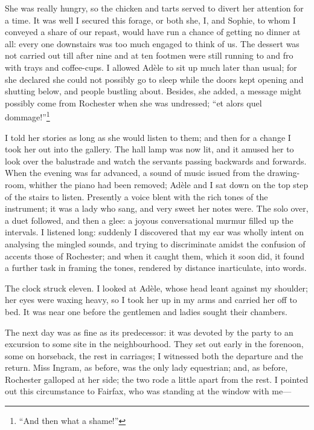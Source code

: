 She was really hungry, so the chicken and tarts served to divert her
attention for a time. It was well I secured this forage, or both she,
I, and Sophie, to whom I conveyed a share of our repast, would have run
a chance of getting no dinner at all: every one downstairs was too much
engaged to think of us. The dessert was not carried out till after nine
and at ten footmen were still running to and fro with trays and
coffee-cups. I allowed Adèle to sit up much later than usual; for she
declared she could not possibly go to sleep while the doors kept opening
and shutting below, and people bustling about. Besides, she added, a
message might possibly come from \Mr{} Rochester when she was undressed;
\foreignquote{french}{et alors quel dommage!}\footnote{\enquote{And then what a shame!}}

I told her stories as long as she would listen to them; and then for a
change I took her out into the gallery. The hall lamp was now lit, and
it amused her to look over the balustrade and watch the servants passing
backwards and forwards. When the evening was far advanced, a sound of
music issued from the drawing-room, whither the piano had been removed;
Adèle and I sat down on the top step of the stairs to listen. Presently
a voice blent with the rich tones of the instrument; it was a lady who
sang, and very sweet her notes were. The solo over, a duet followed,
and then a glee: a joyous conversational murmur filled up the
intervals. I listened long: suddenly I discovered that my ear was
wholly intent on analysing the mingled sounds, and trying to
discriminate amidst the confusion of accents those of \Mr{} Rochester; and
when it caught them, which it soon did, it found a further task in
framing the tones, rendered by distance inarticulate, into words.

The clock struck eleven. I looked at Adèle, whose head leant against my
shoulder; her eyes were waxing heavy, so I took her up in my arms and
carried her off to bed. It was near one before the gentlemen and ladies
sought their chambers.

The next day was as fine as its predecessor: it was devoted by the party
to an excursion to some site in the neighbourhood. They set out early
in the forenoon, some on horseback, the rest in carriages; I witnessed
both the departure and the return. Miss Ingram, as before, was the only
lady equestrian; and, as before, \Mr{} Rochester galloped at her side; the
two rode a little apart from the rest. I pointed out this circumstance
to \Mrs{} Fairfax, who was standing at the window with me---

